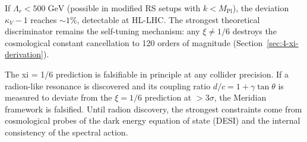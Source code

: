 If $\Lambda_r < 500\;\mathrm{GeV}$ (possible in modified RS setups with $k < M_{\mathrm{Pl}}$), the deviation $\kappa_V - 1$ reaches $\sim 1\%$, detectable at HL-LHC. The strongest theoretical discriminator remains the self-tuning mechanism: any $\xi \neq 1/6$ destroys the cosmological constant cancellation to 120 orders of magnitude (Section~\ref{sec:4-xi-derivation}).

\begin{remark}\label{rmk:4-falsification}
The xi = 1/6 prediction is falsifiable in principle at any collider precision. If a radion-like resonance is discovered and its coupling ratio $d/c = 1 + \gamma\tan\theta$ is measured to deviate from the $\xi = 1/6$ prediction at $> 3\sigma$, the Meridian framework is falsified. Until radion discovery, the strongest constraints come from cosmological probes of the dark energy equation of state (DESI) and the internal consistency of the spectral action.
\end{remark}


